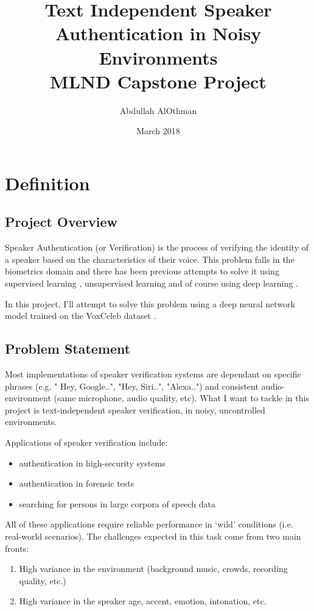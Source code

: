 \documentclass{article}
\title{Text Independent Speaker Authentication in Noisy Environments \\
        \large MLND Capstone Project}
\author{Abdullah AlOthman}
\date{March 2018}
\begin{document}
\maketitle
\section{Definition}

\subsection{Project Overview}

Speaker Authentication (or Verification) is the process of verifying the identity of a speaker based on the characteristics of their voice. This problem falls in the biometrics domain and there has been previous attempts to solve it using supervised learning \cite{Campbell2006SupportVM}, unsupervised learning \cite{Reynolds2000SpeakerVU} and of course using deep learning \cite{Nagrani17}. 

In this project, I'll attempt to solve this problem using a deep neural network model trained on the VoxCeleb dataset \cite{Nagrani17}.


\subsection{Problem Statement} \label{prblmstmt}
Most implementations of speaker verification systems are dependant on specific phrases (e.g. " Hey, Google..", "Hey, Siri..", "Alexa..") and consistent audio-environment (same microphone, audio quality, etc).
What I want to tackle in this project is text-independent speaker verification, in noisy, uncontrolled environments.

Applications of speaker verification include:
\begin{itemize}
    \item authentication in high-security systems
    \item authentication in forensic tests
    \item searching for persons in large corpora of speech data
\end{itemize}
All of these applications require reliable performance in ‘wild’ conditions (i.e. real-world scenarios). The challenges expected in this task come from two main fronts:
\begin{enumerate}
    \item High variance in the environment (background music, crowds, recording quality, etc.)
    \item High variance in the speaker age, accent, emotion, intonation, etc.
\end{enumerate}
\end{document}
